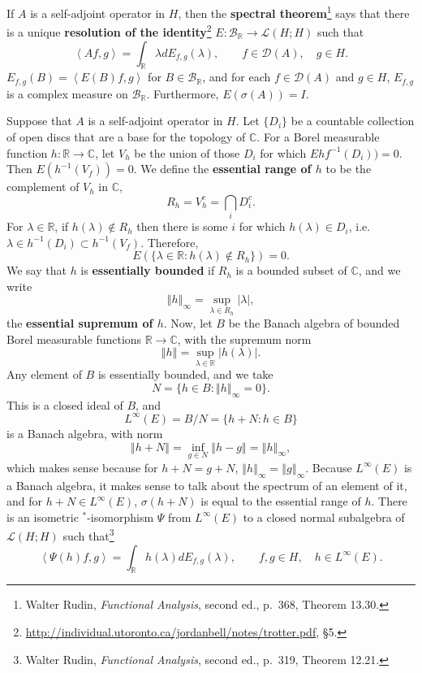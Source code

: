 \documentclass{article}
\newcommand{\inner}[2]{\left\langle #1, #2 \right\rangle}
\newcommand{\norm}[1]{\left\Vert #1 \right\Vert}
\theoremstyle{definition}
\begin{document}
If $A$ is a self-adjoint operator in $H$, then the \textbf{spectral theorem}\footnote{Walter Rudin, {\em Functional Analysis},
second ed., p.~368, Theorem 13.30.} says that there is a unique \textbf{resolution of the identity}\footnote{\url{http://individual.utoronto.ca/jordanbell/notes/trotter.pdf}, \S 5.} 
$E:\mathscr{B}_{\mathbb{R}} \to \mathscr{L}(H;H)$ such that 
\[
\inner{Af}{g} = \int_{\mathbb{R}} \lambda dE_{f,g}(\lambda),\qquad f \in \mathscr{D}(A), \quad g \in H.
\]
$E_{f,g}(B) = \inner{E(B)f}{g}$ for $B \in \mathscr{B}_{\mathbb{R}}$, and for each $f \in \mathscr{D}(A)$ and
$g \in H$, $E_{f,g}$ is a complex measure on $\mathscr{B}_{\mathbb{R}}$. Furthermore,
$E(\sigma(A))=I$. 

Suppose that $A$ is a self-adjoint operator in $H$. Let $\{D_i\}$ be a countable collection of open discs that are a base
 for the topology of $\mathbb{C}$.
For a Borel measurable function $h:\mathbb{R} \to \mathbb{C}$, let $V_h$ be the union of those $D_i$ for which
$Ehf^{-1}(D_i))=0$. Then $E(h^{-1}(V_f))=0$. We define the \textbf{essential range of $h$} to be the complement of $V_h$ in $\mathbb{C}$,
\[
R_h =V_h^c= \bigcap_i D_i^c. 
\]
For $\lambda \in \mathbb{R}$, if $h(\lambda) \not \in R_h$ then there is some $i$ for which $h(\lambda) \in D_i$, i.e. $\lambda \in h^{-1}(D_i) \subset h^{-1}(V_f)$. Therefore,
\[
E(\{\lambda \in \mathbb{R}: h(\lambda) \not \in R_h\}) = 0.
\]
We say that $h$ is \textbf{essentially bounded} if $R_h$ is a bounded subset of $\mathbb{C}$, and we write
\[
\norm{h}_\infty = \sup_{\lambda \in R_h} |\lambda|,
\]
the \textbf{essential supremum of $h$}.
Now, let $B$ be the Banach algebra of bounded Borel measurable functions $\mathbb{R} \to \mathbb{C}$, with the supremum norm
\[
\norm{h} = \sup_{\lambda \in \mathbb{R}} |h(\lambda)|.
\]
Any element of $B$ is essentially bounded, and we take
\[
N = \{h \in B: \norm{h}_\infty = 0\}.
\]
This is a closed ideal of $B$, and
\[
L^\infty(E)=B/N=\{h+N: h \in B\}
\]
is a Banach algebra, with norm
\[
\norm{h+N} =\inf_{g \in N} \norm{h-g} =  \norm{h}_\infty,
\]
which makes sense because for $h+N=g+N$, $\norm{h}_\infty = \norm{g}_\infty$. 
Because $L^\infty(E)$ is a Banach algebra, it makes sense to talk about  the spectrum of an element of it, and for
$h+N \in L^\infty(E)$, 
$\sigma(h+N)$ is equal to the essential range of $h$. 
There is an isometric $^*$-isomorphism $\Psi$ from $L^\infty(E)$ to a closed normal subalgebra of
$\mathscr{L}(H;H)$ such that\footnote{Walter Rudin, {\em Functional Analysis}, second ed., p.~319, Theorem 12.21.}
\[
\inner{\Psi(h)f}{g} = \int_{\mathbb{R}} h(\lambda) dE_{f,g}(\lambda), \qquad f,g \in H, \quad h \in L^\infty(E).
\]
\end{document}
